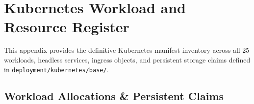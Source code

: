 
\chapter{Kubernetes Workload and Resource Register}
\label{app:k8s_register}

This appendix provides the definitive Kubernetes manifest inventory across all 25 workloads, headless services, ingress objects, and persistent storage claims defined in \nolinkurl{deployment/kubernetes/base/}.

\section{Workload Allocations \& Persistent Claims}

